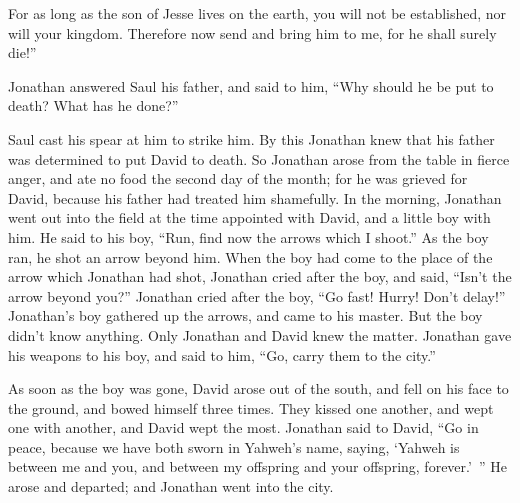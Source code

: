 {For as long as the son of Jesse lives on the earth, you will not be established, nor will your kingdom. Therefore now send and bring him to me, for he shall surely die!”
\par }{\PP {}Jonathan answered Saul his father, and said to him, “Why should he be put to death? What has he done?”
\par }{\PP {}Saul cast his spear at him to strike him. By this Jonathan knew that his father was determined to put David to death.
So Jonathan arose from the table in fierce anger, and ate no food the second day of the month; for he was grieved for David, because his father had treated him shamefully.
In the morning, Jonathan went out into the field at the time appointed with David, and a little boy with him.
He said to his boy, “Run, find now the arrows which I shoot.” As the boy ran, he shot an arrow beyond him.
When the boy had come to the place of the arrow which Jonathan had shot, Jonathan cried after the boy, and said, “Isn’t the arrow beyond you?”
Jonathan cried after the boy, “Go fast! Hurry! Don’t delay!” Jonathan’s boy gathered up the arrows, and came to his master.
But the boy didn’t know anything. Only Jonathan and David knew the matter.
Jonathan gave his weapons to his boy, and said to him, “Go, carry them to the city.”
\par }{\PP {}As soon as the boy was gone, David arose out of the south, and fell on his face to the ground, and bowed himself three times. They kissed one another, and wept one with another, and David wept the most.
Jonathan said to David, “Go in peace, because we have both sworn in Yahweh’s name, saying, ‘Yahweh is between me and you, and between my offspring and your offspring, forever.’ ” He arose and departed; and Jonathan went into the city.

}
